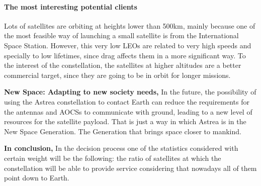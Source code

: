 \paragraph{The most interesting potential clients\\}
Lots of satellites are orbiting at heights lower than 500km, mainly because one of the most feasible way of launching a small satellite is from the International Space Station. However, this very low LEOs are related to very high speeds and specially to low lifetimes, since drag affects them in a more significant way. To the interest of the constellation, the satellites at higher altitudes are a better commercial target, since they are going to be in orbit for longer missions.

\textbf{New Space: Adapting to new society needs,}
In the future, the possibility of using the Astrea constellation to contact Earth can reduce the requirements for the antennas and AOCSs to communicate with ground, leading to a new level of resources for the satellite payload. That is just a way in which Astrea is in the New Space Generation. The Generation that brings space closer to mankind.

\textbf{In conclusion,} In the decision process one of the statistics considered with certain weight will be the following: the ratio of satellites at which the constellation will be able to provide service considering that nowadays all of them point down to Earth. 